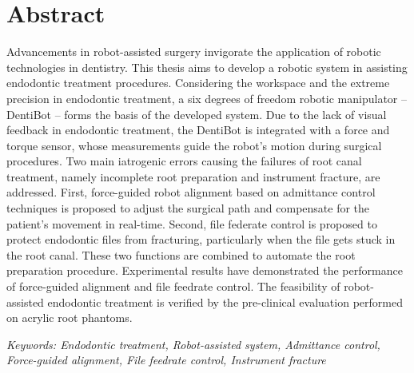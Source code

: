 \chapter{Abstract}
\label{ch:abstract}
\vspace{3mm}
\hspace*{6mm}Advancements in robot-assisted surgery invigorate the application of robotic technologies in dentistry. This thesis aims to develop a robotic system in assisting endodontic treatment procedures. Considering the workspace and the extreme precision in endodontic treatment, a six degrees of freedom robotic manipulator -- DentiBot -- forms the basis of the developed system. Due to the lack of visual feedback in endodontic treatment, the DentiBot is integrated with a force and torque sensor, whose measurements guide the robot's motion during surgical procedures. Two main iatrogenic errors causing the failures of root canal treatment, namely incomplete root preparation and instrument fracture, are addressed. First, force-guided robot alignment based on admittance control techniques is proposed to adjust the surgical path and compensate for the patient's movement in real-time. Second, file federate control is proposed to protect endodontic files from fracturing, particularly when the file gets stuck in the root canal. These two functions are combined to automate the root preparation procedure. Experimental results have demonstrated the performance of force-guided alignment and file feedrate control. The feasibility of robot-assisted endodontic treatment is verified by the pre-clinical evaluation performed on acrylic root phantoms.
\vspace{10mm}
\par\noindent
\textit{Keywords: Endodontic treatment, Robot-assisted system, Admittance control, Force-guided alignment, File feedrate control, Instrument fracture}





